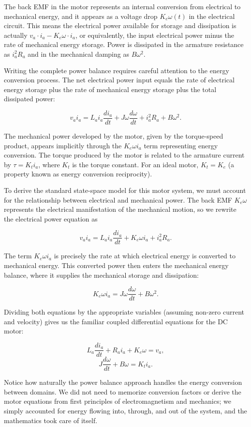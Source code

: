 The back EMF in the motor represents an internal conversion from electrical to mechanical energy, and it appears as a voltage drop $K_e \omega(t)$ in the electrical circuit. This means the electrical power available for storage and dissipation is actually $v_a \cdot i_a - K_e \omega \cdot i_a$, or equivalently, the input electrical power minus the rate of mechanical energy storage. Power is dissipated in the armature resistance as $i_a^2 R_a$ and in the mechanical damping as $B\omega^2$.

Writing the complete power balance requires careful attention to the energy conversion process. The net electrical power input equals the rate of electrical energy storage plus the rate of mechanical energy storage plus the total dissipated power:

\[
v_a i_a = L_a i_a \frac{di_a}{dt} + J\omega \frac{d\omega}{dt} + i_a^2 R_a + B\omega^2.
\]

The mechanical power developed by the motor, given by the torque-speed product, appears implicitly through the $K_e \omega i_a$ term representing energy conversion. The torque produced by the motor is related to the armature current by $\tau = K_t i_a$, where $K_t$ is the torque constant. For an ideal motor, $K_t = K_e$ (a property known as energy conversion reciprocity).

To derive the standard state-space model for this motor system, we must account for the relationship between electrical and mechanical power. The back EMF $K_e \omega$ represents the electrical manifestation of the mechanical motion, so we rewrite the electrical power equation as

\[
v_a i_a = L_a i_a \frac{di_a}{dt} + K_e \omega i_a + i_a^2 R_a.
\]

The term $K_e \omega i_a$ is precisely the rate at which electrical energy is converted to mechanical energy. This converted power then enters the mechanical energy balance, where it supplies the mechanical storage and dissipation:

\[
K_e \omega i_a = J\omega \frac{d\omega}{dt} + B\omega^2.
\]

Dividing both equations by the appropriate variables (assuming non-zero current and velocity) gives us the familiar coupled differential equations for the DC motor:

\[
L_a \frac{di_a}{dt} + R_a i_a + K_e \omega = v_a,
\]
\[
J \frac{d\omega}{dt} + B\omega = K_t i_a.
\]

Notice how naturally the power balance approach handles the energy conversion between domains. We did not need to memorize conversion factors or derive the motor equations from first principles of electromagnetism and mechanics; we simply accounted for energy flowing into, through, and out of the system, and the mathematics took care of itself.

